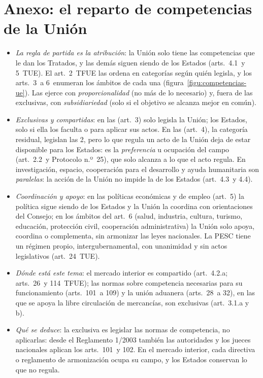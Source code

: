 \documentclass[11pt]{article}
\begin{document}
\section{Anexo: el reparto de competencias\cortetitulo{} de la Unión}\label{anexo:competencias}

\begin{itemize}
\item \emph{La regla de partida es la atribución}: la Unión solo tiene las competencias que le dan los Tratados, y las demás siguen siendo de los Estados (arts.~4.1~y 5~TUE). El art.~2~TFUE las ordena en categorías según quién legisla, y los arts.~3~a 6~enumeran los ámbitos de cada una (figura~\ref{figu:competencias-ue}). Las ejerce con \emph{proporcionalidad} (no más de lo necesario) y, fuera de las exclusivas, con \emph{subsidiariedad} (solo si el objetivo se alcanza mejor en común).
\item \emph{Exclusivas y compartidas}: en las  (art.~3) solo legisla la Unión; los Estados, solo si ella los faculta o para aplicar sus actos. En las  (art.~4), la categoría residual, legislan las 2, pero lo que regula un acto de la Unión deja de estar disponible para los Estados: es la \emph{preferencia} u ocupación del campo (art.~2.2~y Protocolo n.º~25), que solo alcanza a lo que el acto regula. En investigación, espacio, cooperación para el desarrollo y ayuda humanitaria son \emph{paralelas}: la acción de la Unión no impide la de los Estados (art.~4.3~y 4.4).
\item \emph{Coordinación y apoyo}: en las políticas económicas y de empleo (art.~5) la política sigue siendo de los Estados y la Unión la coordina con orientaciones del Consejo; en los ámbitos del art.~6 (salud, industria, cultura, turismo, educación, protección civil, cooperación administrativa) la Unión solo apoya, coordina o complementa, sin armonizar las leyes nacionales. La PESC tiene un régimen propio, intergubernamental, con unanimidad y sin actos legislativos (art.~24~TUE).
\item \emph{Dónde está este tema}: el mercado interior es compartido (art.~4.2.a; arts.~26~y 114~TFUE); las normas sobre competencia necesarias para su funcionamiento (arts.~101~a 109) y la unión aduanera (arts.~28~a 32), en las que se apoya la libre circulación de mercancías, son exclusivas (art.~3.1.a y b).
\item \emph{Qué se deduce}: la exclusiva es legislar las normas de competencia, no aplicarlas: desde el Reglamento 1/2003 también las autoridades y los jueces nacionales aplican los arts.~101~y 102. En el mercado interior, cada directiva o reglamento de armonización ocupa su campo, y los Estados conservan lo que no regula.
\end{itemize}
\end{document}
